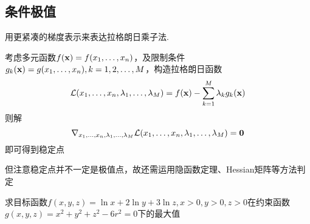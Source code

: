 \subsection{条件极值}
用更紧凑的梯度表示来表达拉格朗日乘子法.\par
考虑多元函数$f(\mathbf{x})=f(x_1,\ldots,x_n)$，及限制条件$g_k(\mathbf{x})=g(x_1,\ldots,x_n),k=1,2,\ldots,M$，构造拉格朗日函数
\[\mathcal{L}(x_1,\ldots,x_n,\lambda_1,\ldots,\lambda_M)=f(\mathbf{x})-\sum_{k=1}^M\lambda_kg_k(\mathbf{x})\]
则解
\[\nabla_{x_1,\ldots,x_n,\lambda_1,\ldots,\lambda_M}\mathcal{L}(x_1,\ldots,x_n,\lambda_1,\ldots,\lambda_M)=\mathbf{0}\]
即可得到稳定点
\par 但注意稳定点并不一定是极值点，故还需运用隐函数定理、Hessian矩阵等方法判定
\begin{example}
求目标函数$f(x,y,z)=\ln x+2\ln y+3\ln z,x>0,y>0,z>0$在约束函数$g(x,y,z)=x^2+y^2+z^2-6r^2=0$下的最大值
\end{example}
